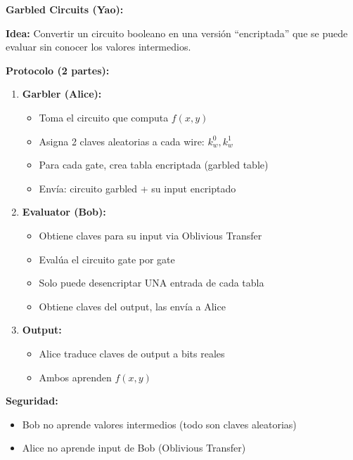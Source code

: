 \documentclass[11pt,a4paper,twoside]{book}
\begin{document}
\begin{keyidea}
\textbf{Garbled Circuits (Yao):}

\textbf{Idea:} Convertir un circuito booleano en una versi\'on ``encriptada'' que se puede evaluar sin conocer los valores intermedios.

\textbf{Protocolo (2 partes):}
\begin{enumerate}
    \item \textbf{Garbler (Alice):}
    \begin{itemize}
        \item Toma el circuito que computa $f(x, y)$
        \item Asigna 2 claves aleatorias a cada wire: $k^0_w, k^1_w$
        \item Para cada gate, crea tabla encriptada (garbled table)
        \item Env\'ia: circuito garbled + su input encriptado
    \end{itemize}
    
    \item \textbf{Evaluator (Bob):}
    \begin{itemize}
        \item Obtiene claves para su input via Oblivious Transfer
        \item Eval\'ua el circuito gate por gate
        \item Solo puede desencriptar UNA entrada de cada tabla
        \item Obtiene claves del output, las env\'ia a Alice
    \end{itemize}
    
    \item \textbf{Output:}
    \begin{itemize}
        \item Alice traduce claves de output a bits reales
        \item Ambos aprenden $f(x, y)$
    \end{itemize}
\end{enumerate}

\textbf{Seguridad:}
\begin{itemize}
    \item Bob no aprende valores intermedios (todo son claves aleatorias)
    \item Alice no aprende input de Bob (Oblivious Transfer)
\end{itemize}
\end{keyidea}
\end{document}
